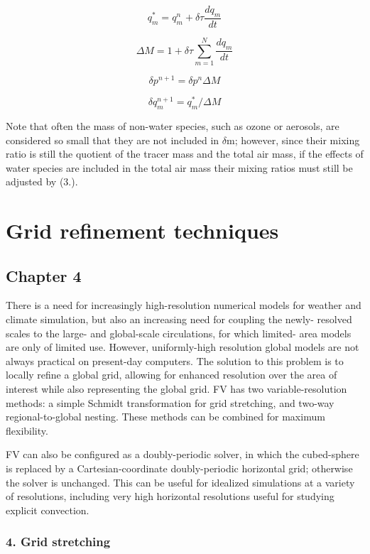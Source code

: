 \[ q^{*}_m = q^n_m + \delta \tau \frac{dq_m}{dt} \tag {3.6} \]

\[ \Delta M = 1 + \delta \tau \sum_{m=1}^N \frac{dq_m}{dt} \tag {3.7} \]

\[ \delta p^{n+1} = \delta p^{n} \Delta M \tag {3.8} \]

\[ \delta q^{n+1}_m = q^{*}_m / \Delta M \tag {3.9} \]

Note that often the mass of non-\/water species, such as ozone or aerosols, are considered so small that they are not included in {$\delta$}m; however, since their mixing ratio is still the quotient of the tracer mass and the total air mass, if the effects of water species are included in the total air mass their mixing ratios must still be adjusted by (3.). \hypertarget{grid}{}\section{Grid refinement techniques}\label{grid}
\subsection*{Chapter 4}

There is a need for increasingly high-\/resolution numerical models for weather and climate simulation, but also an increasing need for coupling the newly-\/ resolved scales to the large-\/ and global-\/scale circulations, for which limited-\/ area models are only of limited use. However, uniformly-\/high resolution global models are not always practical on present-\/day computers. The solution to this problem is to locally refine a global grid, allowing for enhanced resolution over the area of interest while also representing the global grid. FV\textthreesuperior{} has two variable-\/resolution methods\+: a simple Schmidt transformation for grid stretching, and two-\/way regional-\/to-\/global nesting. These methods can be combined for maximum flexibility.

FV\textthreesuperior{} can also be configured as a doubly-\/periodic solver, in which the cubed-\/sphere is replaced by a Cartesian-\/coordinate doubly-\/periodic horizontal grid; otherwise the solver is unchanged. This can be useful for idealized simulations at a variety of resolutions, including very high horizontal resolutions useful for studying explicit convection.

\subsubsection*{4. Grid stretching}

